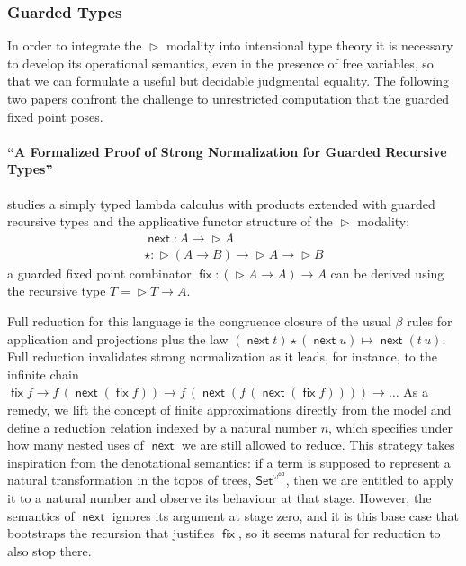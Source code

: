 \documentclass{book}
\DeclareMathOperator{\fix}{\mathsf{fix}}
\newcommand{\red}{\to}
\DeclareMathOperator{\Later}{\vartriangleright}
\DeclareMathOperator{\next}{\ensuremath{\mathsf{next}}}
\begin{document}

\subsubsection{Guarded Types}

In order to integrate the $\Later$ modality into intensional type
theory it is necessary to develop its operational semantics, even in
the presence of free variables, so that we can formulate a useful but
decidable judgmental equality. The following two papers confront the
challenge to unrestricted computation that the guarded fixed point
poses.

  \paragraph{``A Formalized Proof of Strong Normalization for Guarded Recursive Types''}
  studies a simply typed lambda calculus with products extended with guarded
  recursive types and the applicative functor structure of the $\Later$
  modality:
  \[
  \begin{array}{l}
  \next : A \to \Later A \\
  \star : \Later (A \to B) \to \Later A \to \Later B
  \end{array}
  \]
  a guarded fixed point combinator $\fix : (\Later A \to A) \to
  A$ can be derived using the recursive type $T = \Later T \to A$.

  Full reduction for this language
  is the congruence closure of the usual $\beta$ rules
  for application and projections plus the law $(\next t)
  \star (\next u) \mapsto \next (t\,u)$.
  Full reduction invalidates strong normalization as it leads,
  for instance, to the infinite chain
  $\fix f \red f\,(\next (\fix f)) \red f\,(\next (f\,(\next (\fix f)))) \red
  \ldots$
%
  As a remedy, we lift the concept of finite approximations directly from
  the model and define a reduction relation indexed by a natural
  number $n$, which specifies under how many nested uses of $\next$ we
  are still allowed to reduce.
%
  This strategy takes inspiration from the denotational semantics: if
  a term is supposed to represent a natural transformation in the
  topos of trees, $\mathsf{Set}^{\omega^\mathsf{op}}$, then we are
  entitled to apply it to a natural number and observe its behaviour
  at that stage.  However, the semantics of $\next$ ignores its argument at
  stage zero, and it is this base case that bootstraps the recursion
  that justifies $\fix$, so it seems natural for reduction to also
  stop there.
\end{document}

